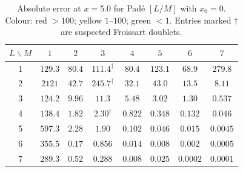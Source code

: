 \documentclass[12pt,a4paper]{article}
\theoremstyle{definition}
\theoremstyle{remark}
\begin{document}
\begin{table}[H]
  \centering
  \caption{Absolute error at $x = 5.0$ for Padé $[L/M]$ with
    $x_0 = 0$.
    Colour: \colorbox{badcell}{red} $> 100$;
    \colorbox{warncell}{yellow} $1$--$100$;
    \colorbox{goodcell}{green} $< 1$.
    Entries marked $\dagger$ are suspected Froissart doublets.}
  \label{tab:matrix}
  \footnotesize
  \renewcommand{\arraystretch}{1.15}
  \setlength{\tabcolsep}{4pt}
  \begin{tabular}{@{}c|ccccccc@{}}
    \toprule
    $L \backslash M$ & $1$ & $2$ & $3$ & $4$ & $5$ & $6$ & $7$\\
    \midrule
    1 & \cellcolor{badcell}$129.3$
      & \cellcolor{warncell}$80.4$
      & \cellcolor{badcell}$111.4^\dagger$
      & \cellcolor{warncell}$80.4$
      & \cellcolor{badcell}$123.1$
      & \cellcolor{warncell}$68.9$
      & \cellcolor{badcell}$279.8$ \\
    2 & \cellcolor{badcell}$2121$
      & \cellcolor{warncell}$42.7$
      & \cellcolor{badcell}$245.7^\dagger$
      & \cellcolor{warncell}$32.1$
      & \cellcolor{warncell}$43.0$
      & \cellcolor{warncell}$13.5$
      & \cellcolor{warncell}$8.11$ \\
    3 & \cellcolor{badcell}$124.2$
      & \cellcolor{warncell}$9.96$
      & \cellcolor{warncell}$11.3$
      & \cellcolor{warncell}$5.48$
      & \cellcolor{warncell}$3.02$
      & \cellcolor{warncell}$1.30$
      & \cellcolor{goodcell}$0.537$ \\
    4 & \cellcolor{badcell}$138.4$
      & \cellcolor{warncell}$1.82$
      & \cellcolor{warncell}$2.30^\dagger$
      & \cellcolor{goodcell}$0.822$
      & \cellcolor{goodcell}$0.348$
      & \cellcolor{goodcell}$0.132$
      & \cellcolor{goodcell}$0.046$ \\
    5 & \cellcolor{badcell}$597.3$
      & \cellcolor{warncell}$2.28$
      & \cellcolor{warncell}$1.90$
      & \cellcolor{goodcell}$0.102$
      & \cellcolor{goodcell}$0.046$
      & \cellcolor{goodcell}$0.015$
      & \cellcolor{goodcell}$0.0045$ \\
    6 & \cellcolor{badcell}$355.5$
      & \cellcolor{goodcell}$0.17$
      & \cellcolor{goodcell}$0.856$
      & \cellcolor{goodcell}$0.014$
      & \cellcolor{goodcell}$0.008$
      & \cellcolor{goodcell}$0.002$
      & \cellcolor{goodcell}$0.0005$ \\
    7 & \cellcolor{badcell}$289.3$
      & \cellcolor{goodcell}$0.52$
      & \cellcolor{goodcell}$0.288$
      & \cellcolor{goodcell}$0.008$
      & \cellcolor{goodcell}$0.025$
      & \cellcolor{goodcell}$0.0002$
      & \cellcolor{goodcell}$0.0001$ \\
    \bottomrule
  \end{tabular}
\end{table}
\end{document}
